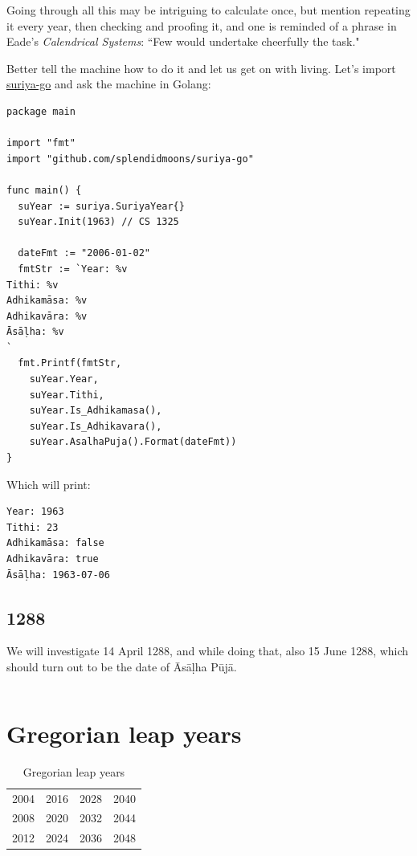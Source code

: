 \documentclass[11pt,oneside]{memoir-article}
\begin{document}
Going through all this may be intriguing to calculate once, but mention
repeating it every year, then checking and proofing it, and one is reminded of a
phrase in Eade's \emph{Calendrical Systems}: ``Few would undertake cheerfully the
task."\autocite{eade1995calendrical}

Better tell the machine how to do it and let us get on with living. Let's
import \href{https://github.com/splendidmoons/suriya-go}{suriya-go} and ask the machine in Golang:

\begin{verbatim}
package main

import "fmt"
import "github.com/splendidmoons/suriya-go"

func main() {
  suYear := suriya.SuriyaYear{}
  suYear.Init(1963) // CS 1325

  dateFmt := "2006-01-02"
  fmtStr := `Year: %v
Tithi: %v
Adhikamāsa: %v
Adhikavāra: %v
Āsāḷha: %v
`
  fmt.Printf(fmtStr,
    suYear.Year,
    suYear.Tithi,
    suYear.Is_Adhikamasa(),
    suYear.Is_Adhikavara(),
    suYear.AsalhaPuja().Format(dateFmt))
}
\end{verbatim}

Which will print:

\begin{verbatim}
Year: 1963
Tithi: 23
Adhikamāsa: false
Adhikavāra: true
Āsāḷha: 1963-07-06
\end{verbatim}

\section{1288}
\label{sec-6-1}
\label{golang-1288}

We will investigate 14 April 1288, and while doing that, also 15 June 1288,
which should turn out to be the date of Āsāḷha Pūjā.

\inputminted{go}{./includes/print-1288.go}


\backmatter

\chapter{Gregorian leap years}
\label{sec-7}

\begin{table}[h]
\caption{\label{tbl-cycle-leap-years} Gregorian leap years}
\centering
\begin{tabular}{rrrr}
2004 & 2016 & 2028 & 2040\\
2008 & 2020 & 2032 & 2044\\
2012 & 2024 & 2036 & 2048\\
\end{tabular}
\end{table}
\end{document}
